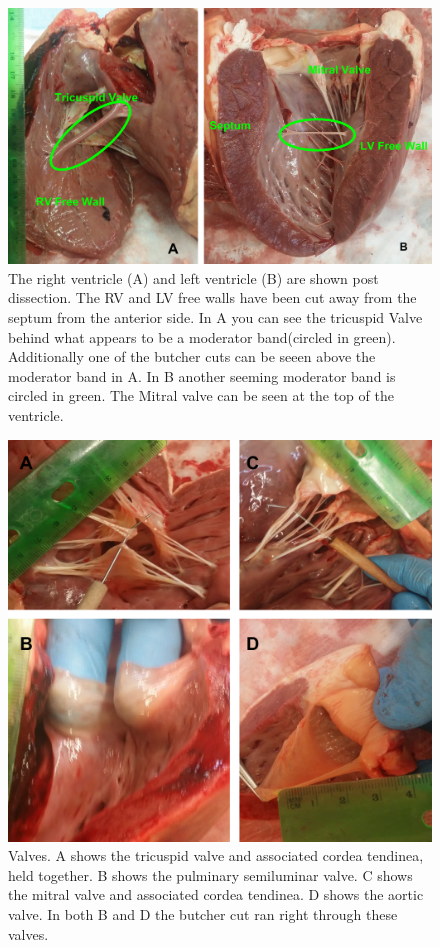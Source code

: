 \documentclass[12pt]{article}
\begin{document}
\begin{figure}[H]
	
	\centering	
	\includegraphics[width = 1\textwidth]{Figures/Heart3.png}
	\caption{ The right ventricle (A) and left ventricle (B) are shown post dissection. The RV and LV free walls have been cut away from the septum from the anterior side. In A you can see the tricuspid Valve behind what appears to be a moderator band(circled in green). Additionally one of the butcher cuts can be seeen above the moderator band in A. In B another seeming moderator band is circled in green. The Mitral valve can be seen at the top of the ventricle. }
	\label{fig:H3}
\end{figure}
\begin{figure}[H]
	
	\centering	
	\includegraphics[width = 1\textwidth]{Figures/Heart4.png}
	\caption{ Valves. A shows the tricuspid valve and associated cordea tendinea, held together. B shows the pulminary semiluminar valve. C shows the mitral valve and associated cordea tendinea. D shows the aortic valve. In both B and D the butcher cut ran right through these valves. }
	\label{fig:H4}
\end{figure}
\end{document}
